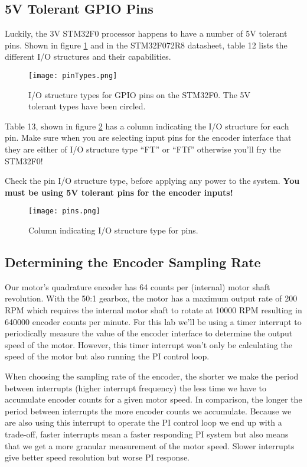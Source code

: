 \documentclass[openany,11pt,fleqn]{book} %
\begin{document}
\subsection{5V Tolerant GPIO Pins}
Luckily, the 3V STM32F0 processor happens to have a number of 5V tolerant pins. Shown in figure \ref{pinTypes} and in the STM32F072R8 datasheet, table 12 lists the different I/O structures and their capabilities.  

\begin{figure}[tb]
    \centering\texttt{[image: pinTypes.png]}
    \caption{I/O structure types for GPIO pins on the STM32F0. The 5V tolerant types have been circled.}
    \label{pinTypes}
\end{figure}

Table 13, shown in figure \ref{pins} has a column indicating the I/O structure for each pin. Make sure when you are selecting input pins for the encoder interface that they are either of I/O structure type ``FT'' or ``FTf'' otherwise you'll fry the STM32F0!

\begin{warning}
    Check the pin I/O structure type, before applying any power to the system. \textbf{You must be using 5V tolerant pins for the encoder inputs!} 
\end{warning}



\begin{figure}[tb]
    \centering\texttt{[image: pins.png]}
    \caption{Column indicating I/O structure type for pins.}
    \label{pins}
\end{figure}

\subsection{Determining the Encoder Sampling Rate} \label{encoder_example}

Our motor's quadrature encoder has 64 counts per (internal) motor shaft revolution. With the 50:1 gearbox, the motor has a maximum output rate of 200 RPM which requires the internal motor shaft to rotate at 10000 RPM resulting in 640000 encoder counts per minute. For this lab we'll be using a timer interrupt to periodically measure the value of the encoder interface to determine the output speed of the motor. However, this timer interrupt won't only be calculating the speed of the motor but also running the PI control loop.

When choosing the sampling rate of the encoder, the shorter we make the period between interrupts (higher interrupt frequency) the less time we have to accumulate encoder counts for a given motor speed. In comparison, the longer the period between interrupts the more encoder counts we accumulate. 
Because we are also using this interrupt to operate the PI control loop we end up with a trade-off, faster interrupts mean a faster responding PI system but also means that we get a more granular measurement of the motor speed. Slower interrupts give better speed resolution but worse PI response.
\end{document}
